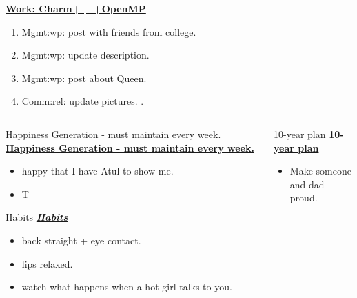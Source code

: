\begin{minipage}{\columnwidth} 
\underline{\bf \tiny {Work: Charm++ +OpenMP}}
\begin{enumerate}
\item \tiny Mgmt:wp: post with friends from college. 
\item \tiny Mgmt:wp: update description.
\item \tiny Mgmt:wp: post about Queen.
\item \tiny Comm:rel: update pictures. .
\end{enumerate}
\end{minipage}

\ifdefined\POSTER
  \begin{columns}
   \begin{column}{0.22\columnwidth}
      \begin{block}{Happiness Generation - must maintain every week.}
\else
 \underline{\bf Happiness Generation - must maintain every week.}
\fi
\begin{itemize}
          \tiny \item \tiny happy that I have Atul to show me.
          \item \tiny T
            \end{itemize}
\ifdefined\POSTER
      \end{block}
\fi

\ifdefined\POSTER
    \begin{block}{Habits}
\else
 \underline{\bf \it Habits}
\fi
      \begin{itemize}
        \tiny \item \tiny back straight + eye contact.
      \item \tiny lips relaxed.
      \item \tiny watch what happens when a hot girl talks to you.
      \end{itemize}
\ifdefined\POSTER
    \end{block}
  \end{column} %
\fi

\ifdefined\POSTER
  \begin{column}{0.5\columnwidth}
    \begin{block}{10-year plan}   %
\else
 \underline{\bf 10-year plan}
\fi
      \begin{itemize}
      \item \small Make someone and dad proud.
      \end{itemize}
\ifdefined\POSTER
    \end{block}
\fi


\end{column}
\end{columns}

